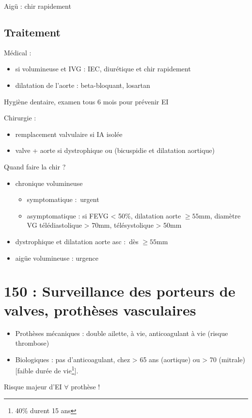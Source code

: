 \documentclass{article}
\begin{document}
Aigü : chir rapidement

\subsection{Traitement}
Médical : 
\begin{itemize}
  \item si volumineuse et IVG : IEC, diurétique et chir rapidement
  \item dilatation de l'aorte : beta-bloquant, losartan
\end{itemize}
Hygiène dentaire, examen tous 6 mois pour prévenir EI

Chirurgie : 
\begin{itemize}
  \item remplacement valvulaire si IA isolée
  \item valve + aorte si dystrophique ou (bicuspidie et dilatation aortique)
\end{itemize}

Quand faire la chir ?
\begin{itemize}
  \item chronique volumineuse
    \begin{itemize}
      \item  symptomatique : urgent \danger
      \item asymptomatique : si FEVG < 50\%, dilatation aorte $\ge 55$mm, diamètre
        VG télédiastolique > 70mm, télésystolique > 50mm
    \end{itemize}
  \item dystrophique et dilatation aorte asc : dès $\ge 55$mm
  \item aigüe volumineuse : urgence
\end{itemize}

\section{150 : Surveillance des porteurs de valves, prothèses vasculaires}%
\label{sec:150_surveillance_des_porteurs_de_valves_protheses_vasculaires}

\begin{itemize}
  \item Prothèses mécaniques : double ailette, à vie, anticoagulant à vie
    (risque thrombose)
  \item Biologiques : pas d'anticoagulant, chez > 65 ans (aortique) ou > 70
    (mitrale) [faible durée de vie\footnote{40\% durent 15 ans}].
\end{itemize}
Risque majeur d'EI $\forall$ prothèse !
\end{document}
